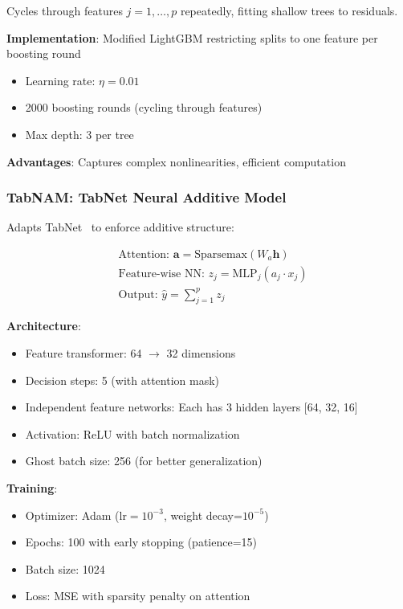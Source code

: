 \documentclass[twocolumn]{article}
\begin{document}
Cycles through features $j = 1, \ldots, p$ repeatedly, fitting shallow trees to residuals.

\textbf{Implementation}: Modified LightGBM restricting splits to one feature per boosting round
\begin{itemize}
\item Learning rate: $\eta = 0.01$
\item 2000 boosting rounds (cycling through features)
\item Max depth: 3 per tree
\end{itemize}

\textbf{Advantages}: Captures complex nonlinearities, efficient computation

\subsubsection{TabNAM: TabNet Neural Additive Model}

Adapts TabNet~\cite{arik2021tabnet} to enforce additive structure:

\begin{equation}
\begin{aligned}
& \text{Attention: } \mathbf{a} = \text{Sparsemax}(W_a \mathbf{h}) \\
& \text{Feature-wise NN: } z_j = \text{MLP}_j(a_j \cdot x_j) \\
& \text{Output: } \hat{y} = \sum_{j=1}^{p} z_j
\end{aligned}
\end{equation}

\textbf{Architecture}:
\begin{itemize}
\item Feature transformer: 64 $\to$ 32 dimensions
\item Decision steps: 5 (with attention mask)
\item Independent feature networks: Each has 3 hidden layers [64, 32, 16]
\item Activation: ReLU with batch normalization
\item Ghost batch size: 256 (for better generalization)
\end{itemize}

\textbf{Training}:
\begin{itemize}
\item Optimizer: Adam ($\text{lr}=10^{-3}$, weight decay=$10^{-5}$)
\item Epochs: 100 with early stopping (patience=15)
\item Batch size: 1024
\item Loss: MSE with sparsity penalty on attention
\end{itemize}
\end{document}
